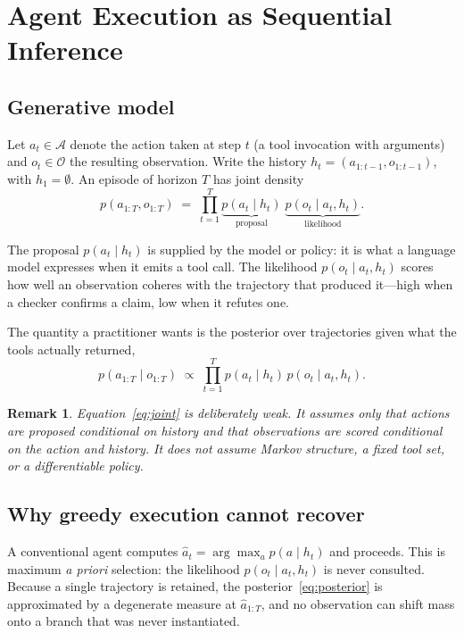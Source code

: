 \documentclass[11pt,a4paper]{article}
\newtheorem{remark}{Remark}
\begin{document}
\section{Agent Execution as Sequential Inference}
\label{sec:model}

\subsection{Generative model}

Let $a_t \in \mathcal{A}$ denote the action taken at step $t$ (a tool
invocation with arguments) and $o_t \in \mathcal{O}$ the resulting observation.
Write the history $h_t = (a_{1:t-1}, o_{1:t-1})$, with $h_1 = \emptyset$. An
episode of horizon $T$ has joint density
\begin{equation}
p(a_{1:T}, o_{1:T})
  \;=\; \prod_{t=1}^{T} \underbrace{p(a_t \mid h_t)}_{\text{proposal}}\;
                        \underbrace{p(o_t \mid a_t, h_t)}_{\text{likelihood}}.
\label{eq:joint}
\end{equation}

The proposal $p(a_t \mid h_t)$ is supplied by the model or policy: it is what a
language model expresses when it emits a tool call. The likelihood
$p(o_t \mid a_t, h_t)$ scores how well an observation coheres with the
trajectory that produced it---high when a checker confirms a claim, low when it
refutes one.

The quantity a practitioner wants is the posterior over trajectories given what
the tools actually returned,
\begin{equation}
p(a_{1:T} \mid o_{1:T}) \;\propto\; \prod_{t=1}^{T} p(a_t \mid h_t)\, p(o_t \mid a_t, h_t).
\label{eq:posterior}
\end{equation}

\begin{remark}
Equation~\eqref{eq:joint} is deliberately weak. It assumes only that actions
are proposed conditional on history and that observations are scored
conditional on the action and history. It does not assume Markov structure,
a fixed tool set, or a differentiable policy.
\end{remark}

\subsection{Why greedy execution cannot recover}

A conventional agent computes
$\hat a_t = \arg\max_{a} p(a \mid h_t)$
and proceeds. This is maximum \emph{a priori} selection: the likelihood
$p(o_t \mid a_t, h_t)$ is never consulted. Because a single trajectory is
retained, the posterior~\eqref{eq:posterior} is approximated by a degenerate
measure at $\hat a_{1:T}$, and no observation can shift mass onto a branch that
was never instantiated.
\end{document}

